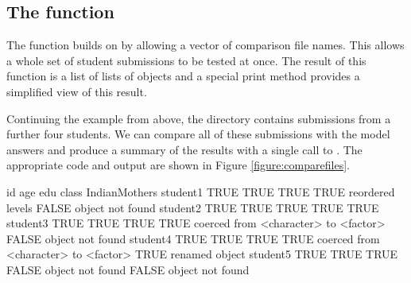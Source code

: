 \subsection*{The  function}

The  function builds on 
by allowing a vector of comparison file names.  This allows a whole
set of student submissions to be tested at once.
The result of this function is a list of lists of 
 objects and a special print method provides
a simplified view of this result.

Continuing the example from above,
the  directory contains submissions from a further
four students.  We can compare all of these submissions
with the model answers and produce a summary of the results with
a single call to . The appropriate code
and output are shown in Figure
\ref{figure:comparefiles}.

\begin{figure*}
\begin{Schunk}
\end{Schunk}
{\small
\begin{Schunk}
\begin{Soutput}
         id    age   edu   class                                     IndianMothers         
student1 TRUE  TRUE  TRUE  TRUE reordered levels                     FALSE object not found
student2 TRUE  TRUE  TRUE  TRUE                                      TRUE                  
student3 TRUE  TRUE  TRUE  TRUE coerced from <character> to <factor> FALSE object not found
student4 TRUE  TRUE  TRUE  TRUE coerced from <character> to <factor> TRUE renamed object   
student5 TRUE  TRUE  TRUE  FALSE object not found                    FALSE object not found
\end{Soutput}
\end{Schunk}
}
\caption{\label{figure:comparefiles}%
Using the  function to run \R{} code from several
files and compare the results to model objects.  The result of this sort
of comparison can easily get quite wide, so it is often useful to 
print the result with  set to some large value
and using a small font, as has been done here.}
\end{figure*}

